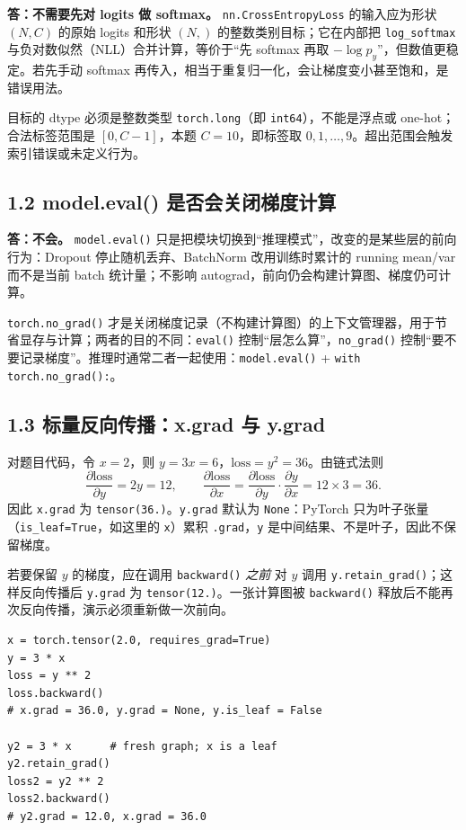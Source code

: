 \documentclass[11pt,a4paper]{ctexart}
\begin{document}
\textbf{答：不需要先对 logits 做 softmax。} \texttt{nn.CrossEntropyLoss} 的输入应为形状 $(N,C)$ 的原始 logits 和形状 $(N,)$ 的整数类别目标；它在内部把 \texttt{log\_softmax} 与负对数似然（NLL）合并计算，等价于“先 softmax 再取 $-\log p_{y}$”，但数值更稳定。若先手动 softmax 再传入，相当于重复归一化，会让梯度变小甚至饱和，是错误用法。

目标的 dtype 必须是整数类型 \texttt{torch.long}（即 \texttt{int64}），不能是浮点或 one-hot；合法标签范围是 $[0,C-1]$，本题 $C=10$，即标签取 $0,1,\dots,9$。超出范围会触发索引错误或未定义行为。

\subsection{1.2 model.eval() 是否会关闭梯度计算}

\textbf{答：不会。} \texttt{model.eval()} 只是把模块切换到“推理模式”，改变的是某些层的前向行为：Dropout 停止随机丢弃、BatchNorm 改用训练时累计的 running mean/var 而不是当前 batch 统计量；不影响 autograd，前向仍会构建计算图、梯度仍可计算。

\texttt{torch.no\_grad()} 才是关闭梯度记录（不构建计算图）的上下文管理器，用于节省显存与计算；两者的目的不同：\texttt{eval()} 控制“层怎么算”，\texttt{no\_grad()} 控制“要不要记录梯度”。推理时通常二者一起使用：\texttt{model.eval()} + \texttt{with torch.no\_grad():}。

\subsection{1.3 标量反向传播：x.grad 与 y.grad}

对题目代码，令 $x=2$，则 $y=3x=6$，$\text{loss}=y^2=36$。由链式法则
\[
\frac{\partial \text{loss}}{\partial y}=2y=12,\qquad
\frac{\partial \text{loss}}{\partial x}=\frac{\partial \text{loss}}{\partial y}\cdot\frac{\partial y}{\partial x}=12\times 3=36 .
\]
因此 \texttt{x.grad} 为 \texttt{tensor(36.)}。\texttt{y.grad} 默认为 \texttt{None}：PyTorch 只为叶子张量（\texttt{is\_leaf=True}，如这里的 \texttt{x}）累积 \texttt{.grad}，\texttt{y} 是中间结果、不是叶子，因此不保留梯度。

若要保留 $y$ 的梯度，应在调用 \texttt{backward()} \emph{之前} 对 $y$ 调用 \texttt{y.retain\_grad()}；这样反向传播后 \texttt{y.grad} 为 \texttt{tensor(12.)}。一张计算图被 \texttt{backward()} 释放后不能再次反向传播，演示必须重新做一次前向。

\begin{lstlisting}
x = torch.tensor(2.0, requires_grad=True)
y = 3 * x
loss = y ** 2
loss.backward()
# x.grad = 36.0, y.grad = None, y.is_leaf = False

y2 = 3 * x      # fresh graph; x is a leaf
y2.retain_grad()
loss2 = y2 ** 2
loss2.backward()
# y2.grad = 12.0, x.grad = 36.0
\end{lstlisting}
\end{document}
